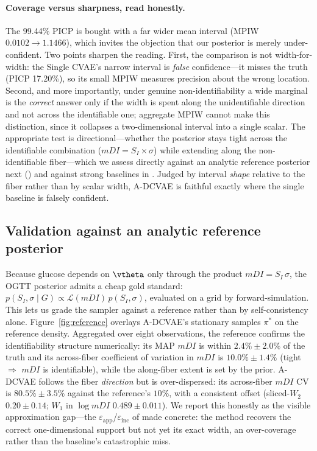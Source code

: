 \paragraph{Coverage versus sharpness, read honestly.}
The 99.44\% PICP is bought with a far wider mean interval (MPIW $0.0102 \to 1.1466$), which invites the objection that our posterior is merely under-confident. Two points sharpen the reading. First, the comparison is not width-for-width: the Single CVAE's narrow interval is \emph{false} confidence---it misses the truth (PICP 17.20\%), so its small MPIW measures precision about the wrong location. Second, and more importantly, under genuine non-identifiability a wide marginal is the \emph{correct} answer only if the width is spent along the unidentifiable direction and not across the identifiable one; aggregate MPIW cannot make this distinction, since it collapses a two-dimensional interval into a single scalar. The appropriate test is directional---whether the posterior stays tight across the identifiable combination ($mDI = S_I \times \sigma$) while extending along the non-identifiable fiber---which we assess directly against an analytic reference posterior next () and against strong baselines in . Judged by interval \emph{shape} relative to the fiber rather than by scalar width, A-DCVAE is faithful exactly where the single baseline is falsely confident.

\subsection{Validation against an analytic reference posterior}
\label{sec:reference}

Because glucose depends on $\vtheta$ only through the product $mDI = S_I\,\sigma$, the OGTT posterior admits a cheap gold standard: $p(S_I,\sigma \mid G) \propto \mathcal{L}(mDI)\,p(S_I,\sigma)$, evaluated on a grid by forward-simulation. This lets us grade the sampler against a reference rather than by self-consistency alone. Figure~\ref{fig:reference} overlays A-DCVAE's stationary samples $\pi^\ast$ on the reference density. Aggregated over eight observations, the reference confirms the identifiability structure numerically: its MAP $mDI$ is within $2.4\% \pm 2.0\%$ of the truth and its across-fiber coefficient of variation in $mDI$ is $10.0\% \pm 1.4\%$ (tight $\Rightarrow$ $mDI$ is identifiable), while the along-fiber extent is set by the prior. A-DCVAE follows the fiber \emph{direction} but is over-dispersed: its across-fiber $mDI$ CV is $80.5\% \pm 3.5\%$ against the reference's $10\%$, with a consistent offset (sliced-$W_2$ $0.20 \pm 0.14$; $W_1$ in $\log mDI$ $0.489 \pm 0.011$). We report this honestly as the visible approximation gap---the $\varepsilon_{\mathrm{app}}$/$\varepsilon_{\mathrm{inc}}$ of  made concrete: the method recovers the correct one-dimensional support but not yet its exact width, an over-coverage rather than the baseline's catastrophic miss.

